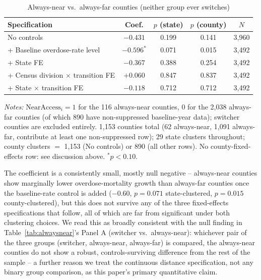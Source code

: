 \documentclass[preprint,12pt,authoryear]{elsarticle}
\begin{document}
\begin{table}[htbp]
\centering
\caption{Always-near vs.\ always-far counties (neither group ever switches)}
\label{tab:alwaysnearfar}
\begin{tabular}{@{}lcccc@{}}
\toprule
Specification & Coef. & $p$ (state) & $p$ (county) & $N$ \\
\midrule
No controls & $-0.431$ & 0.199 & 0.141 & 3{,}960 \\
+ Baseline overdose-rate level & $-0.596^{*}$ & 0.071 & 0.015 & 3{,}492 \\
+ State FE & $-0.367$ & 0.388 & 0.254 & 3{,}492 \\
+ Census division $\times$ transition FE & $+0.060$ & 0.847 & 0.837 & 3{,}492 \\
+ State $\times$ transition FE & $-0.118$ & 0.712 & 0.712 & 3{,}492 \\
\bottomrule
\end{tabular}
\vspace{2pt}
\begin{minipage}{0.92\textwidth}
\footnotesize\emph{Notes:} $\text{NearAccess}_i=1$ for the 116
always-near counties, $0$ for the 2,038 always-far counties (of which
890 have non-suppressed baseline-year data); switcher counties are
excluded entirely. 1,153 counties total (62 always-near, 1,091
always-far, contribute at least one non-suppressed row); 29 state
clusters throughout; county clusters $=$ 1,153 (No controls) or 890
(all other rows). No
county-fixed-effects row: see discussion above. $^{*}p<0.10$.
\end{minipage}
\end{table}

The coefficient is a consistently small, mostly null negative --
always-near counties show marginally lower overdose-mortality growth
than always-far counties once the baseline-rate control is added
($-0.60$, $p=0.071$ state-clustered, $p=0.015$ county-clustered), but
this does not survive any of the three fixed-effects specifications
that follow, all of which are far from significant under both
clustering choices. We read this as broadly consistent with the null
finding in Table~\ref{tab:alwaysnear}'s Panel A (switcher vs.\
always-near): whichever pair of the three groups (switcher, always-near,
always-far) is compared, the always-near counties do not show a
robust, controls-surviving difference from the rest of the sample --
a further reason we treat the continuous distance specification, not
any binary group comparison, as this paper's primary quantitative
claim.
\end{document}
